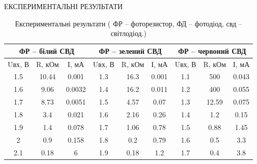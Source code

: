 \documentclass[a4paper,14pt]{extreport}
\begin{document}
\begin{center}
ЕКСПЕРИМЕНТАЛЬНІ РЕЗУЛЬТАТИ
\end{center}
\begin{table}[h!]
\caption{Експериментальні результати ( ФР – фоторезистор, ФД – фотодіод, свд – світлодіод.)}
\begin{tabular}{|ccc|ccc|ccc|}
\hline
\multicolumn{3}{|c|}{ФР – білий СВД}                                & \multicolumn{3}{c|}{ФР – зелений СВД}                             & \multicolumn{3}{c|}{ФР – червоний СВД}                            \\ \hline
\multicolumn{1}{|c|}{Uвх, В} & \multicolumn{1}{c|}{R, кОм} & І, мА  & \multicolumn{1}{c|}{Uвх, В} & \multicolumn{1}{c|}{R, кОм} & І, мА & \multicolumn{1}{c|}{Uвх, В} & \multicolumn{1}{c|}{R, кОм} & І, мА \\ \hline
\multicolumn{1}{|c|}{1.5}    & \multicolumn{1}{c|}{10.44}  & 0.001  & \multicolumn{1}{c|}{1.3}    & \multicolumn{1}{c|}{16.3}   & 0.001 & \multicolumn{1}{c|}{1.1}    & \multicolumn{1}{c|}{500}    & 0.043 \\ \hline
\multicolumn{1}{|c|}{1.6}    & \multicolumn{1}{c|}{9.06}   & 0.0032 & \multicolumn{1}{c|}{1.4}    & \multicolumn{1}{c|}{16.2}   & 0.011 & \multicolumn{1}{c|}{1.2}    & \multicolumn{1}{c|}{400}    & 0.055 \\ \hline
\multicolumn{1}{|c|}{1.7}    & \multicolumn{1}{c|}{8.73}   & 0.0051 & \multicolumn{1}{c|}{1.5}    & \multicolumn{1}{c|}{4.57}   & 0.07  & \multicolumn{1}{c|}{1.3}    & \multicolumn{1}{c|}{12.59}  & 0.075 \\ \hline
\multicolumn{1}{|c|}{1.8}    & \multicolumn{1}{c|}{3.4}    & 0.021  & \multicolumn{1}{c|}{1.6}    & \multicolumn{1}{c|}{2.16}   & 0.26  & \multicolumn{1}{c|}{1.4}    & \multicolumn{1}{c|}{1.2}    & 0.15  \\ \hline
\multicolumn{1}{|c|}{1.9}    & \multicolumn{1}{c|}{1.4}    & 0.078  & \multicolumn{1}{c|}{1.7}    & \multicolumn{1}{c|}{1.06}   & 0.78  & \multicolumn{1}{c|}{1.5}    & \multicolumn{1}{c|}{0.88}   & 1.45  \\ \hline
\multicolumn{1}{|c|}{2}      & \multicolumn{1}{c|}{0.9}    & 0.158  & \multicolumn{1}{c|}{1.8}    & \multicolumn{1}{c|}{0.2}    & 0.79  & \multicolumn{1}{c|}{1.6}    & \multicolumn{1}{c|}{0.5}    & 3.3   \\ \hline
\multicolumn{1}{|c|}{2.1}    & \multicolumn{1}{c|}{0.18}   & 6      & \multicolumn{1}{c|}{1.9}    & \multicolumn{1}{c|}{0.18}   & 1.2   & \multicolumn{1}{c|}{1.7}    & \multicolumn{1}{c|}{0.4}    & 3.8   \\ \hline

\end{tabular}
\end{table}
\end{document}
